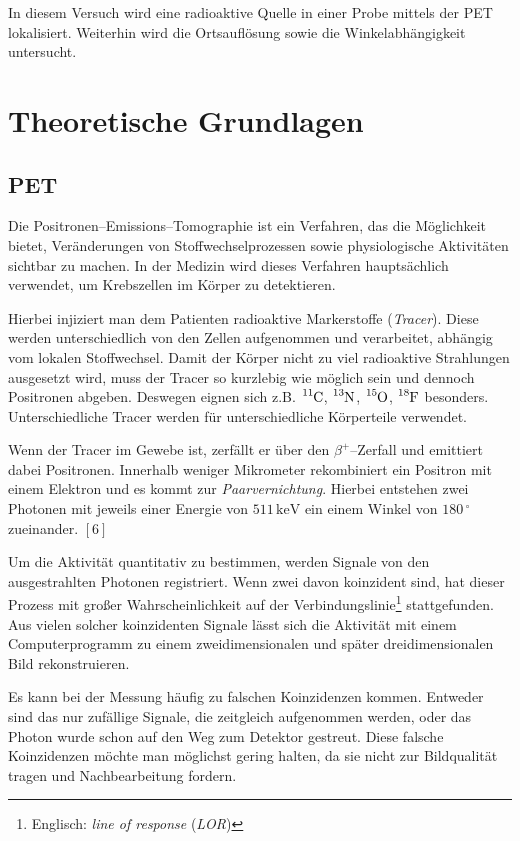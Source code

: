 \documentclass[12pt,a4paper]{scrartcl}
\numberwithin{equation}{section} %
\newcommand{\pu}[1]{\ensuremath{\mathrm{#1}}}
\renewcommand{\[}{} %
\renewcommand{\]}{\noindent} %
\begin{document}
In diesem Versuch wird eine radioaktive Quelle in einer Probe mittels
der PET lokalisiert. Weiterhin wird die Ortsauflösung sowie die
Winkelabhängigkeit untersucht.

\clearpage
\hypertarget{theoretische-grundlagen}{%
\section{Theoretische Grundlagen}\label{theoretische-grundlagen}}

\hypertarget{pet}{%
\subsection{PET}\label{pet}}

Die Positronen--Emissions--Tomographie ist ein Verfahren, das die
Möglichkeit bietet, Veränderungen von Stoffwechselprozessen sowie
physiologische Aktivitäten sichtbar zu machen. In der Medizin wird
dieses Verfahren hauptsächlich verwendet, um Krebszellen im Körper zu
detektieren.

Hierbei injiziert man dem Patienten radioaktive Markerstoffe
(\emph{Tracer}). Diese werden unterschiedlich von den Zellen aufgenommen
und verarbeitet, abhängig vom lokalen Stoffwechsel. Damit der Körper
nicht zu viel radioaktive Strahlungen ausgesetzt wird, muss der Tracer
so kurzlebig wie möglich sein und dennoch Positronen abgeben. Deswegen
eignen sich z.B. \(\ce{^{11}C}\), \(\ce{^{13}N}\), \(\ce{^{15}O}\),
\(\ce{^{18}F}\) besonders. Unterschiedliche Tracer werden für
unterschiedliche Körperteile verwendet.

Wenn der Tracer im Gewebe ist, zerfällt er über den \(\beta^+\)--Zerfall
und emittiert dabei Positronen. Innerhalb weniger Mikrometer
rekombiniert ein Positron mit einem Elektron und es kommt zur
\emph{Paarvernichtung}. Hierbei entstehen zwei Photonen mit jeweils
einer Energie von \(\pu{511 \,keV}\) ein einem Winkel von \(180\,^\circ\)
zueinander. \([6]\)

Um die Aktivität quantitativ zu bestimmen, werden Signale von den
ausgestrahlten Photonen registriert. Wenn zwei davon koinzident sind,
hat dieser Prozess mit großer Wahrscheinlichkeit auf der
Verbindungslinie\footnote{Englisch: \emph{line of response} (\emph{LOR})}
stattgefunden. Aus vielen solcher koinzidenten Signale lässt sich die
Aktivität mit einem Computerprogramm zu einem zweidimensionalen und
später dreidimensionalen Bild rekonstruieren.

Es kann bei der Messung häufig zu falschen Koinzidenzen kommen. Entweder
sind das nur zufällige Signale, die zeitgleich aufgenommen werden, oder
das Photon wurde schon auf den Weg zum Detektor gestreut. Diese falsche
Koinzidenzen möchte man möglichst gering halten, da sie nicht zur
Bildqualität tragen und Nachbearbeitung fordern.
\end{document}
